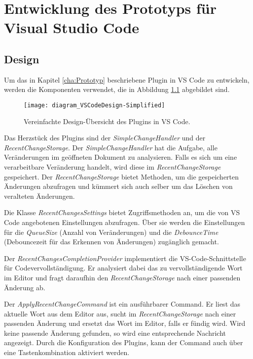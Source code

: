\chapter{Entwicklung des Prototyps für Visual Studio Code}
\label{cha:EntwicklungVsCode}

\section{Design}
\label{sec:EntwicklungVsCode_Design}

Um das in Kapitel \ref{cha:Prototyp} beschriebene Plugin in VS Code
zu entwickeln, werden die Komponenten verwendet, die in 
Abbildung \ref{fig:diagram_VSCodeDesign-Simplified} abgebildet sind.
\begin{figure}
    \centering
    \texttt{[image: diagram\_VSCodeDesign-Simplified]}
    \caption{Vereinfachte Design-Übersicht des Plugins in  VS Code.}
    \label{fig:diagram_VSCodeDesign-Simplified}
\end{figure}  

Das Herzstück des Plugins sind der \emph{SimpleChangeHandler} und
der \emph{RecentChangeStorage}. Der \emph{SimpleChangeHandler} hat die Aufgabe,
alle Veränderungen im geöffneten Dokument zu analysieren. Falls es sich um
eine verarbeitbare Veränderung handelt, wird diese im \emph{RecentChangeStorage}
gespeichert. Der \emph{RecentChangeStorage} bietet Methoden, um die
gespeicherten Änderungen abzufragen und kümmert sich auch selber um das
Löschen von veralteten Änderungen.

Die Klasse \emph{RecentChangesSettings} bietet Zugriffsmethoden an,
um die von VS Code angebotenen Einstellungen abzufragen. Über sie
werden die Einstellungen für die \emph{QueueSize} (Anzahl von Veränderungen)
und die \emph{DebounceTime} (Debouncezeit für das Erkennen von Änderungen)
zugänglich gemacht.

Der \emph{RecentChangesCompletionProvider} implementiert die VS-Code-Schnittstelle
für Codevervollständigung. Er analysiert dabei das zu vervollständigende Wort
im Editor und fragt daraufhin den \emph{RecentChangeStorage} nach einer passenden
Änderung ab.

Der \emph{ApplyRecentChangeCommand} ist ein ausführbarer Command. Er liest
das aktuelle Wort aus dem Editor aus, sucht im \emph{RecentChangeStorage}
nach einer passenden Änderung und ersetzt das Wort im Editor, falls
er fündig wird. Wird keine passende Änderung gefunden, so wird eine entsprechende
Nachricht angezeigt. Durch die Konfiguration des Plugins, kann der
Command auch über eine Tastenkombination aktiviert werden.

